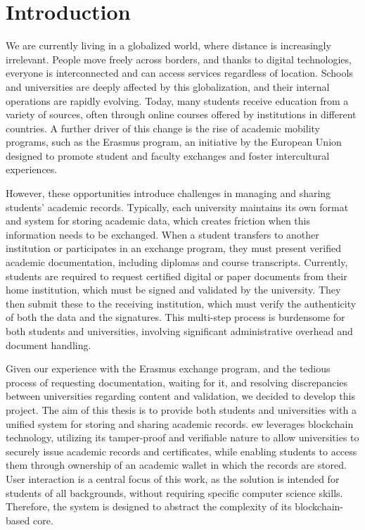 \chapter{Introduction}
\label{chap:introduction}
We are currently living in a globalized world, where distance is increasingly irrelevant. People move freely across borders, and thanks to digital technologies, everyone is interconnected and can access services regardless of location. Schools and universities are deeply affected by this globalization, and their internal operations are rapidly evolving. Today, many students receive education from a variety of sources, often through online courses offered by institutions in different countries. 
A further driver of this change is the rise of academic mobility programs, such as the Erasmus program, an initiative by the European Union designed to promote student and faculty exchanges and foster intercultural experiences.

However, these opportunities introduce challenges in managing and sharing students' academic records. Typically, each university maintains its own format and system for storing academic data, which creates friction when this information needs to be exchanged. When a student transfers to another institution or participates in an exchange program, they must present verified academic documentation, including diplomas and course transcripts. Currently, students are required to request certified digital or paper documents from their home institution, which must be signed and validated by the university. They then submit these to the receiving institution, which must verify the authenticity of both the data and the signatures. This multi-step process is burdensome for both students and universities, involving significant administrative overhead and document handling.

Given our experience with the Erasmus exchange program, and the tedious process of requesting documentation, waiting for it, and resolving discrepancies between universities regarding content and validation, we decided to develop this project. The aim of this thesis is to provide both students and universities with a unified system for storing and sharing academic records. \gls{ew} leverages blockchain technology, utilizing its tamper-proof and verifiable nature to allow universities to securely issue academic records and certificates, while enabling students to access them through ownership of an academic wallet in which the records are stored. User interaction is a central focus of this work, as the solution is intended for students of all backgrounds, without requiring specific computer science skills. Therefore, the system is designed to abstract the complexity of its blockchain-based core.

